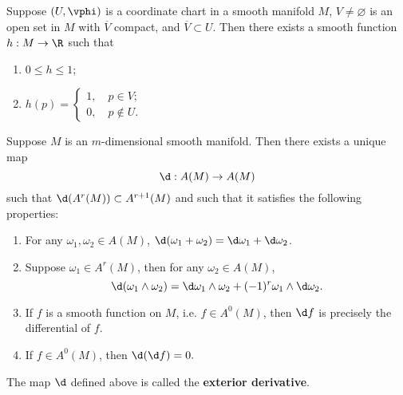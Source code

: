 \documentclass[11pt]{article}
\begin{document}
\begin{lemma}\label{lem:local}
    Suppose $(U, \vphi)$ is a coordinate chart in a smooth manifold $M$, $V \neq \varnothing$ is an open set in $M$ with $\overline{V}$ compact, and $\overline{V} \subset U$. Then there exists a smooth function $h : M \rightarrow \R$ such that 
    \begin{enumerate}
        \item $0 \le h \le 1$;
        \item $h(p) = \begin{cases}1,\quad p \in V; \\ 0, \quad p\not\in U.\end{cases}$
    \end{enumerate}
\end{lemma}

\begin{theorem}
    Suppose $M$ is an $m$-dimensional smooth manifold. Then there exists a unique map $$\d : A(M) \rightarrow A(M)$$ such that $\d(A^r(M)) \subset A^{r+1}(M)$ and such that it satisfies the following properties:
    \begin{enumerate}
        \item For any $\omega_1, \omega_2 \in A(M)$, $\d(\omega_1 + \omega_2) = \d\omega_1 + \d\omega_2$.
        \item Suppose $\omega_1 \in A^r(M)$, then for any $\omega_2 \in A(M)$, $$\d(\omega_1 \wedge \omega_2) = \d\omega_1 \wedge \omega_2 + (-1)^r\omega_1 \wedge \d\omega_2.$$
        \item If $f$ is a smooth function on $M$, i.e. $f \in A^0(M)$, then $\d f$ is precisely the differential of $f$. 
        \item If $f \in A^0(M)$, then $\d(\d f) = 0.$
    \end{enumerate}
    The map $\d$ defined above is called the \textbf{exterior derivative}. 
\end{theorem}
\end{document}
